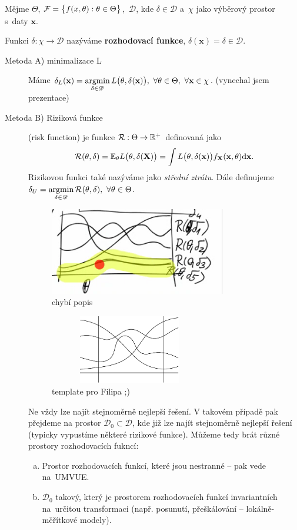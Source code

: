 \begin{define}
	Mějme $\Theta$, $\mathcal{F}=\big\{ f(x,\theta):\theta\in\Theta \big\}$,~$\mathscr{D}$, kde $\delta\in\mathscr{D}$ a~$\chi$ jako výběrový prostor s~daty $\textbf{x}$.
	
	Funkci $\delta:\chi\to\mathscr{D}$ nazýváme \textbf{rozhodovací funkce}, $\delta(\textbf{x})=\delta\in\mathscr{D}$. 
\end{define}
\begin{description}
	\item[Metoda A) minimalizace L] Máme $\delta_L(\textbf{x})=\mathop{\mathrm{argmin}}\limits_{\delta\in\mathscr{D}} L\big(\theta,\delta(\textbf{x})\big),~\forall \theta\in\Theta,~\forall\textbf{x}\in\chi$. (vynechal jsem prezentace)
	\item[Metoda B) Riziková funkce] (risk function) je funkce $\mathcal{R}:\Theta\to\mathbb{R}^+$ definovaná jako $$\mathcal{R}(\theta,\delta)=\mathbb{E}_\theta L\big(\theta,\delta(\textbf{X})\big)=\int L\big(\theta,\delta(\textbf{x})\big)f_\textbf{X}(\textbf{x},\theta)\mathrm{d}\textbf{x}.$$
	Rizikovou funkci také nazýváme jako \textit{střední ztrátu}. Dále definujeme $\delta_U=\mathop{\mathrm{argmin}}\limits_{\delta\in\mathscr{D}} \mathcal{R}(\theta,\delta),~\forall\theta\in\Theta$.
\begin{figure}[h]
	\centering
	\includegraphics[width=0.5\linewidth]{pictures/P4_1}
	\caption{chybí popis}
	\label{fig:p41}
\end{figure}\begin{figure}[h]
\centering
\includegraphics[width=7cm,height=3cm]{pictures/P4_1v2}
\caption{template pro Filipa ;)}
\label{fig:p41v2}
\end{figure}
Ne vždy lze najít stejnoměrně nejlepší řešení. V takovém případě pak přejdeme na prostor $\mathscr{D}_0\subset\mathscr{D}$, kde již lze najít stejnoměrně nejlepší řešení (typicky vypustíme některé rizikové funkce). Můžeme tedy brát různé prostory rozhodovacích fukncí:
\begin{enumerate}[a)]
	\item  Prostor rozhodovacích funkcí, které jsou nestranné -- pak vede na~UMVUE.
	\item $\mathscr{D}_0$ takový, který je prostorem rozhodovacích funkcí invariantních na~určitou transformaci (např. posunutí, přeškálování -- lokálně-měřítkové modely).
\end{enumerate}


\end{description}
